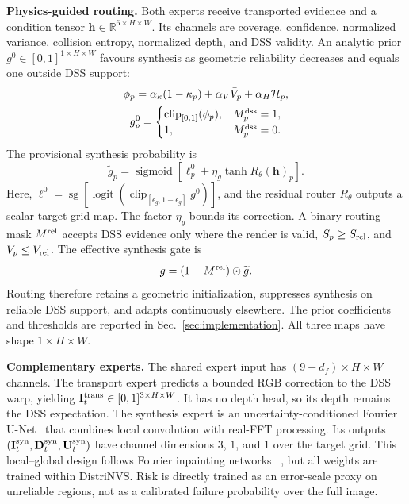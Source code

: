 \documentclass[letterpaper,10pt,conference]{ieeeconf}
\newcommand{\R}{\mathbb{R}}
\newcommand{\I}{\mathbf{I}}
\newcommand{\D}{\mathbf{D}}
\newcommand{\U}{\mathbf{U}}
\begin{document}
\noindent\textbf{Physics-guided routing.}
Both experts receive transported evidence and a condition tensor
$\mathbf h\in\R^{6\times H\times W}$. Its channels are coverage, confidence,
normalized variance, collision entropy, normalized depth, and DSS validity.
An analytic prior $g^0\in[0,1]^{1\times H\times W}$ favours synthesis as
geometric reliability decreases and equals one outside DSS support:
\begin{equation}
\begin{gathered}
 \phi_p=\alpha_\kappa(1-\kappa_p)+\alpha_V\bar V_p
 +\alpha_H\mathcal H_p,\\
 g_p^0=\begin{cases}
 \operatorname{clip}_{[0,1]}(\phi_p),&M_p^{\rm dss}=1,\\
 1,&M_p^{\rm dss}=0.
 \end{cases}
\end{gathered}
\label{eq:physics-prior}
\end{equation}
The provisional synthesis probability is
\begin{equation}
 \widetilde g_p=\operatorname{sigmoid}\!\left[
 \ell_p^0+\eta_g\tanh R_\theta(\mathbf h)_p\right].
\label{eq:router}
\end{equation}
Here, $\ell^0=\operatorname{sg}[\operatorname{logit}(
\operatorname{clip}_{[\epsilon_g,1-\epsilon_g]}g^0)]$, and the residual router
$R_\theta$ outputs a scalar target-grid map. The factor $\eta_g$ bounds its
correction. A binary routing mask $M^{\rm rel}$ accepts DSS evidence only
where the render is valid, $S_p\geq S_{\rm rel}$, and
$V_p\leq V_{\rm rel}$. The effective synthesis gate is
\begin{equation}
 g=(1-M^{\rm rel})\odot\widetilde g.
 \label{eq:effective-gate}
\end{equation}
Routing therefore retains a geometric initialization, suppresses synthesis on
reliable DSS support, and adapts continuously elsewhere. The prior coefficients
and thresholds are reported in Sec.~\ref{sec:implementation}. All three maps
have shape $1\times H\times W$.

\noindent\textbf{Complementary experts.}
The shared expert input has $(9+d_f)\times H\times W$ channels. The transport
expert predicts a bounded RGB correction to the DSS warp, yielding
$\I_t^{\rm trans}\in[0,1]^{3\times H\times W}$. It has no depth head, so its
depth remains the DSS expectation. The synthesis expert is an
uncertainty-conditioned Fourier U-Net~\cite{ronneberger2015unet} that combines
local convolution with real-FFT processing. Its outputs
$(\I_t^{\rm syn},\D_t^{\rm syn},\U_t^{\rm syn})$ have channel dimensions
$3$, $1$, and $1$ over the target grid. This local--global design follows
Fourier inpainting networks
~\cite{suvorov2022lama,chu2023uffc}, but all weights are trained within
DistriNVS. Risk is directly trained as an error-scale proxy on unreliable
regions, not as a calibrated failure probability over the full image.
\end{document}

